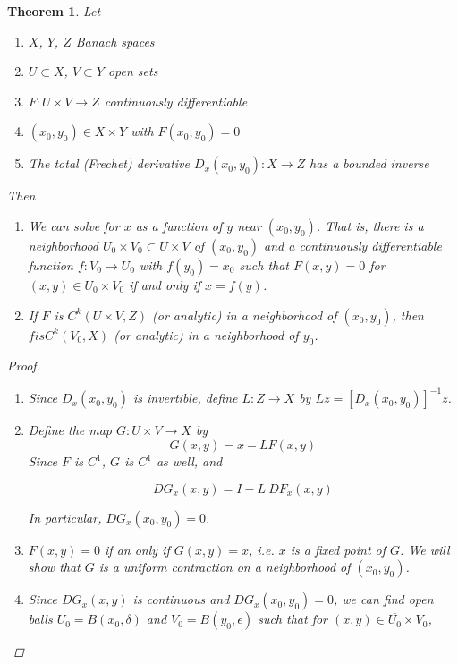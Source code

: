 \documentclass{article}
\newtheorem{theorem}{Theorem}[section]
\begin{document}
\begin{theorem} 
Let
\begin{enumerate}
\item $X$, $Y$, $Z$ Banach spaces
\item $U \subset X$, $V \subset Y$ open sets
\item $F: U \times V \rightarrow Z$ continuously differentiable
\item $(x_0, y_0) \in X \times Y$ with $F(x_0, y_0) = 0$
\item The total (Frechet) derivative $D_x(x_0, y_0): X \rightarrow Z$ has a bounded inverse
\end{enumerate}
Then
\begin{enumerate}
\item We can solve for $x$ as a function of $y$ near $(x_0, y_0)$. That is, there is a neighborhood $U_0 \times V_0 \subset U \times V$ of $(x_0, y_0)$ and a continuously differentiable function $f: V_0 \rightarrow U_0$ with $f(y_0) = x_0$ such that $F(x, y) = 0$ for $(x, y) \in U_0 \times V_0$ if and only if $x = f(y)$.

\item If $F$ is $C^k(U \times V, Z)$ (or analytic) in a neighborhood of $(x_0, y_0)$, then $f is C^k(V_0,X)$ (or analytic) in a neighborhood of $y_0$.
\end{enumerate}

\begin{proof}
\begin{enumerate}
\item Since $D_x(x_0, y_0)$ is invertible, define $L: Z \rightarrow X$ by $Lz = [D_x(x_0, y_0)]^{-1}z$. 
\item Define the map $G: U \times V \rightarrow X$ by 
\begin{equation}\label{defG}
G(x, y) = x - L F(x, y)
\end{equation}
Since $F$ is $C^1$, $G$ is $C^1$ as well, and

\[
DG_x(x, y) = I - L \: DF_x(x, y)
\]

In particular, $DG_x(x_0, y_0) = 0$.

\item $F(x, y) = 0$ if an only if $G(x, y) = x$, i.e. $x$ is a fixed point of $G$. We will show that $G$ is a uniform contraction on a neighborhood of $(x_0, y_0)$. 

\item Since $DG_x(x, y)$ is continuous and $DG_x(x_0, y_0) = 0$, we can find open balls $U_0 = B(x_0, \delta)$ and $V_0 = B(y_0, \epsilon)$ such that for $(x, y) \in \overline{U_0} \times V_0$,


\end{enumerate}
\end{proof}
\end{theorem}
\end{document}
